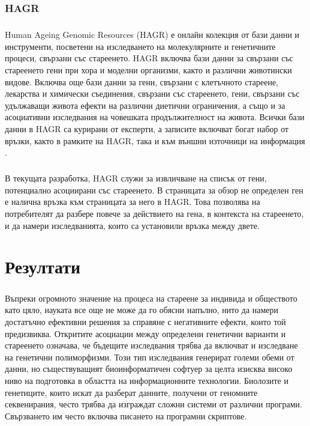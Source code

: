 \documentclass[pdftex,cyrillic,14pt,a4page,twoside,openright]{extreport}
\begin{document}
\subsection{HAGR}
\paragraph{}
Human Ageing Genomic Resources (HAGR) е онлайн колекция от бази данни и инструменти, посветени на изследването на молекулярните и генетичните процеси, свързани със стареенето. HAGR включва бази данни за свързани със стареенето гени при хора и моделни организми, както и различни животински видове. Включва още бази данни за гени, свързани с клетъчното стареене, лекарства и химически съединения, свързани със стареенето, гени, свързани със удължаващи живота ефекти на различни диетични ограничения, а също и за асоциативни изследвания на човешката продължителност на живота. Всички бази данни в HAGR са курирани от експерти, а записите включват богат набор от връзки, както в рамките на HAGR, така и към външни източници на информация \cite{tacutu2018}.

\paragraph{}
В текущата разработка, HAGR служи за извличване на списък от гени, потенциално асоциирани със стареенето. В страницата за обзор не определен ген е налична връзка към страницата за него в HAGR. Това позволява на потребителят да разбере повече за действието на гена, в контекста на стареенето, и да намери изследванията, които са установили връзка между двете.

\chapter{Резултати}
\paragraph{}
Въпреки огромното значение на процеса на стареене за индивида и обществото като цяло, науката все още не може да го обясни напълно, нито да намери достатъчно ефективни решения за справяне с негативните ефекти, които той предизвиква. Откритите асоциации между определени генетични варианти и стареенето означава, че бъдещите изследвания трябва да включват и изследване на генетични полиморфизми. Този тип изследвания генерират големи обеми от данни, но съществуващият биоинформатичен софтуер за целта изисква високо ниво на подготовка в областта на информационните технологии. Биолозите и генетиците, които искат да разберат данните, получени от геномните секвенирания, често трябва да изграждат сложни системи от различни програми. Свързването им често включва писането на програмни скриптове.
\end{document}

